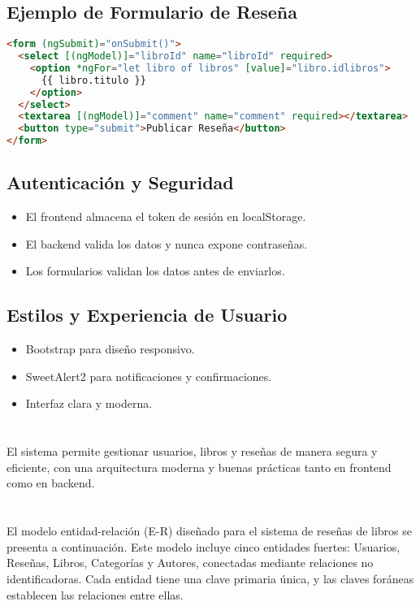 \documentclass[10pt,a4paper]{article}
\begin{document}
\subsection{Ejemplo de Formulario de Reseña}
\begin{lstlisting}[language=HTML]
<form (ngSubmit)="onSubmit()">
  <select [(ngModel)]="libroId" name="libroId" required>
    <option *ngFor="let libro of libros" [value]="libro.idlibros">
      {{ libro.titulo }}
    </option>
  </select>
  <textarea [(ngModel)]="comment" name="comment" required></textarea>
  <button type="submit">Publicar Reseña</button>
</form>
\end{lstlisting}

\subsection{Autenticación y Seguridad}
\begin{itemize}
    \item El frontend almacena el token de sesión en localStorage.
    \item El backend valida los datos y nunca expone contraseñas.
    \item Los formularios validan los datos antes de enviarlos.
\end{itemize}

\subsection{Estilos y Experiencia de Usuario}
\begin{itemize}
    \item Bootstrap para diseño responsivo.
    \item SweetAlert2 para notificaciones y confirmaciones.
    \item Interfaz clara y moderna.
\end{itemize}

\section{\color{colorIPN}{Conclusión}}
El sistema permite gestionar usuarios, libros y reseñas de manera segura y eficiente, con una arquitectura moderna y buenas prácticas tanto en frontend como en backend.

\section{\color{colorIPN}{Modelo Entidad-Relación}}
El modelo entidad-relación (E-R) diseñado para el sistema de reseñas de libros se presenta a continuación. Este modelo incluye cinco entidades fuertes: Usuarios, Reseñas, Libros, Categorías y Autores, conectadas mediante relaciones no identificadoras. Cada entidad tiene una clave primaria única, y las claves foráneas establecen las relaciones entre ellas.
\end{document}
